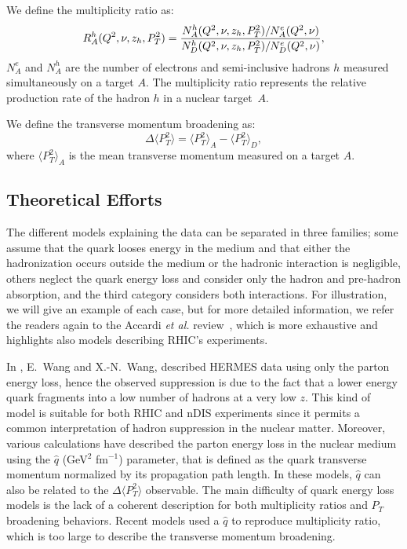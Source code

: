 We define the multiplicity ratio as:
\begin{equation}
R_A^h (Q^2,\nu,z_h,P_T^2) = {{N_A^h (Q^2,\nu,z_h,P_T^2) / N_A^e (Q^2,\nu)} 
                       \over {N_D^h (Q^2,\nu,z_h,P_T^2) / N_D^e (Q^2,\nu)}},
\end{equation}
$N^e_A$ and $N_A^h$ are the number of electrons and semi-inclusive hadrons $h$ measured simultaneously on a target $A$. The multiplicity ratio represents the relative production rate of the hadron $h$ in a nuclear target~$A$.
\newline

We define the transverse momentum broadening as:
\begin{equation}
\Delta \langle P_T^2 \rangle = \langle P_T^2 \rangle_A - \langle P_T^2 \rangle_D,
\end{equation}
where $\langle P_T^2 \rangle_A$ is the mean transverse momentum measured on a target $A$.


\subsection{Theoretical Efforts}
\label{sec:theo}

The different models explaining the data can be separated in three families;
some assume that the quark looses energy in the medium and that either the hadronization occurs outside the medium or the hadronic interaction is 
negligible, others neglect the quark energy loss and consider
only the hadron and pre-hadron absorption, and the third category considers both
interactions. For illustration, we will give an example of each case, but for more detailed information, we refer the readers again to the Accardi {\it et al.} review~\cite{Accardi:2009qv}, which is more exhaustive and highlights also models describing RHIC's experiments.

In \cite{Wang:2002ri}, E.~Wang and X.-N.~Wang, described HERMES data using only 
the parton energy loss, hence the observed suppression is due to the fact that a lower energy quark fragments into a low number of hadrons at a very low $z$. This kind of model is suitable for both RHIC and nDIS experiments since it permits a common interpretation of hadron suppression in the nuclear matter. Moreover, various calculations have described the parton energy loss in the nuclear medium using the $\hat q$ (GeV$^2$ fm$^{-1}$) parameter, that is defined as the quark transverse momentum normalized by its propagation path length. In these models, $\hat q$ can also be related to the $\Delta \langle P_T^2 \rangle$ observable. The main difficulty of quark energy loss models is the lack of a coherent description for both multiplicity ratios and $P_T$ broadening behaviors. Recent models used a $\hat q$ to reproduce multiplicity ratio, which is too large to describe the transverse momentum broadening.

